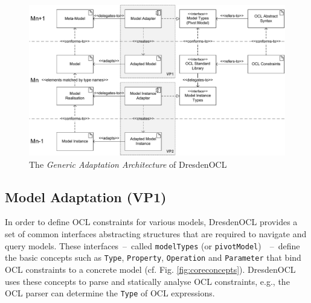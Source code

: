 \begin{figure}[p]
				\includegraphics[width=1.00\textwidth]{figures/modeladaptation.pdf}
			\caption{The \emph{Generic Adaptation Architecture} of DresdenOCL
			}
			\label{fig:modeladaptation}			
		\end{figure}

\subsection{Model Adaptation (VP1)}

	In order to define OCL constraints for various models,
	DresdenOCL provides a set of common interfaces abstracting structures
	that are required to navigate and query models.
	These interfaces~--~called \texttt{modelTypes} (or \texttt{pivotModel})~\cite{braeuerOCL07}~--~define
	the basic	concepts such as \texttt{Type}, \texttt{Property}, \texttt{Operation} and \texttt{Parameter}
	that bind OCL constraints to a concrete model (cf. Fig. \ref{fig:coreconcepts}).
	DresdenOCL uses these concepts to parse and statically analyse OCL constraints, 
	e.g., the OCL parser can determine the \texttt{Type} of OCL expressions.
	
